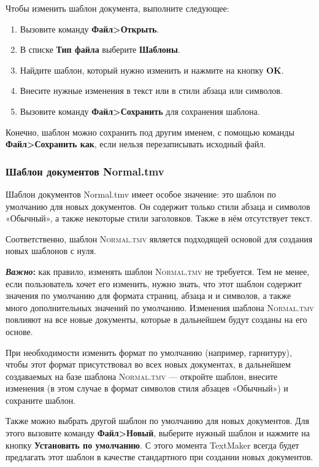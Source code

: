 \documentclass[a4paper,10pt]{article}
\begin{document}
Чтобы изменить шаблон документа, выполните следующее:
\begin{enumerate}
 \item Вызовите команду \textbf{Файл>Открыть}.
 \item В списке \textbf{Тип файла} выберите \textbf{Шаблоны}.
 \item Найдите шаблон, который нужно изменить и нажмите на кнопку \textbf{OK}.
 \item Внесите нужные изменения в текст или в стили абзаца или символов.
 \item Вызовите команду \textbf{Файл>Сохранить} для сохранения шаблона.
\end{enumerate}

Конечно, шаблон можно сохранить под другим именем, с помощью команды \textbf{Файл>Сохранить как}, если нельзя перезаписывать исходный файл.

\subsubsection{Шаблон документов Normal.tmv}
Шаблон документов Normal.tmv имеет особое значение: это шаблон по умолчанию для новых документов. Он содержит только стили абзаца и символов «Обычный», а также некоторые стили заголовков. Также в нём отсутствует текст.

Соответственно, шаблон \textsc{Normal.tmv} является подходящей основой для создания новых шаблонов с нуля.

\begin{mdframed}[backgroundcolor=blue!10]
\textbf{\textit{Важно}:} как правило, изменять шаблон \textsc{Normal.tmv} не требуется. Тем не менее, если пользователь хочет его изменить, нужно знать, что этот шаблон содержит значения по умолчанию для формата страниц, абзаца и и символов, а также много дополнительных значений по умолчанию. Изменения шаблона \textsc{Normal.tmv} повлияют на все новые документы, которые в дальнейшем будут созданы на его основе.
\end{mdframed}

При необходимости изменить формат по умолчанию (например, гарнитуру), чтобы этот формат присутствовал во всех новых документах, в дальнейшем создаваемых на базе шаблона \textsc{Normal.tmv}  --- откройте шаблон, внесите изменения (в этом случае в формат символов стиля абзацев «Обычный») и сохраните шаблон.

Также можно выбрать другой шаблон по умолчанию для новых документов. Для этого вызовите команду \textbf{Файл>Новый}, выберите нужный шаблон и нажмите на кнопку \textbf{Установить по умолчанию}. С этого момента TextMaker всегда будет предлагать этот шаблон в качестве стандартного при создании новых документов.
\end{document}
